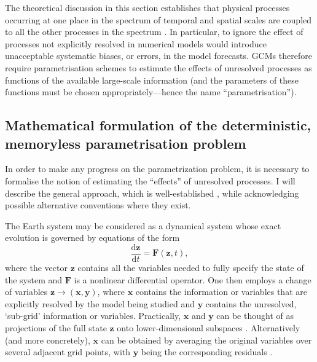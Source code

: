 \documentclass[titlepage,twoside]{article}
\numberwithin{equation}{section}
\newcommand{\diff}[2]{\frac{\mathrm{d} #1}{\mathrm{d} #2}}
\renewcommand\vec{\bm}
\begin{document}
The theoretical discussion in this section establishes that physical processes
occurring at one place in the spectrum of temporal and spatial scales are
coupled to all the other processes in the spectrum \parencite{franzke2015}. In
particular, to ignore the effect of processes not explicitly resolved in
numerical models would introduce unacceptable systematic biases, or errors, in
the model forecasts. GCMs therefore require parametrisation schemes to estimate
the effects of unresolved processes as functions of the available large-scale
information (and the parameters of these functions must be chosen
appropriately---hence the name ``parametrisation'').


\subsection{Mathematical formulation of the deterministic, memoryless parametrisation problem}%
\label{sec:math}
In order to make any progress on the parametrization problem, it is necessary
to formalise the notion of estimating the ``effects'' of unresolved processes.
I will describe the general approach, which is well-established \parencite[see,
e.g.,][]{hasselmann1976,palmer2001,demaeyer2018,brajard2021}, while
acknowledging possible alternative conventions where they exist.

The Earth system may be considered as a dynamical system whose exact evolution
is governed by equations of the form
\begin{equation} \label{eqn:truth}
    \diff{\vec{z}}{t} = \vec{F}(\vec{z},t),
\end{equation}
where the vector $\vec{z}$ contains all the variables needed to fully specify
the state of the system and $\vec{F}$ is a nonlinear differential operator. One
then employs a change of variables $\vec{z} \to (\vec{x},\vec{y})$, where
$\vec{x}$ contains the information or variables that are explicitly resolved by
the model being studied and $\vec{y}$ contains the unresolved, `sub-grid'
information or variables. Practically, $\vec{x}$ and $\vec{y}$ can be thought
of as projections of the full state $\vec{z}$ onto lower-dimensional
subspaces \parencite{brajard2021}. Alternatively (and more concretely),
$\vec{x}$ can be obtained by averaging the original variables over several
adjacent grid points, with $\vec{y}$ being the corresponding residuals
\parencite{zacharuk2018,alcala2021}.
\end{document}
